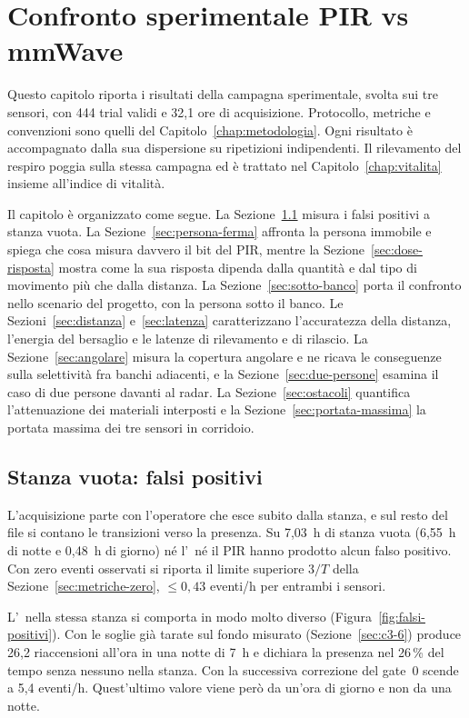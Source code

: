 \chapter{Confronto sperimentale PIR vs mmWave}
\label{chap:confronto}

Questo capitolo riporta i risultati della campagna sperimentale, svolta sui tre sensori, con 444 trial validi e 32,1 ore di acquisizione. Protocollo, metriche e convenzioni sono quelli del Capitolo~\ref{chap:metodologia}. Ogni risultato è accompagnato dalla sua dispersione su ripetizioni indipendenti. Il rilevamento del respiro poggia sulla stessa campagna ed è trattato nel Capitolo~\ref{chap:vitalita} insieme all'indice di vitalità.

Il capitolo è organizzato come segue. La Sezione~\ref{sec:falsi-positivi} misura i falsi positivi a stanza vuota. La Sezione~\ref{sec:persona-ferma} affronta la persona immobile e spiega che cosa misura davvero il bit del PIR, mentre la Sezione~\ref{sec:dose-risposta} mostra come la sua risposta dipenda dalla quantità e dal tipo di movimento più che dalla distanza. La Sezione~\ref{sec:sotto-banco} porta il confronto nello scenario del progetto, con la persona sotto il banco. Le Sezioni~\ref{sec:distanza} e~\ref{sec:latenza} caratterizzano l'accuratezza della distanza, l'energia del bersaglio e le latenze di rilevamento e di rilascio. La Sezione~\ref{sec:angolare} misura la copertura angolare e ne ricava le conseguenze sulla selettività fra banchi adiacenti, e la Sezione~\ref{sec:due-persone} esamina il caso di due persone davanti al radar. La Sezione~\ref{sec:ostacoli} quantifica l'attenuazione dei materiali interposti e la Sezione~\ref{sec:portata-massima} la portata massima dei tre sensori in corridoio.

\section{Stanza vuota: falsi positivi}
\label{sec:falsi-positivi}

L'acquisizione parte con l'operatore che esce subito dalla stanza, e sul resto del
file si contano le transizioni verso la presenza. Su 7,03~h di stanza vuota (6,55~h di notte e 0,48~h di giorno) né l'\ldb\ né il PIR hanno prodotto alcun
falso positivo. Con zero eventi osservati si riporta il limite superiore $3/T$ della
Sezione~\ref{sec:metriche-zero}, $\leq 0{,}43$ eventi/h per entrambi i sensori.

L'\ldc\ nella stessa stanza si comporta in modo molto diverso
(Figura~\ref{fig:falsi-positivi}). Con le soglie già tarate sul fondo misurato (Sezione~\ref{sec:c3-6}) produce 26,2 riaccensioni all'ora in una notte di 7~h
e dichiara la presenza nel 26\,\% del tempo senza nessuno nella stanza. Con la
successiva correzione del gate~0 scende a 5,4 eventi/h. Quest'ultimo valore viene però da un'ora di giorno e non da una notte.

